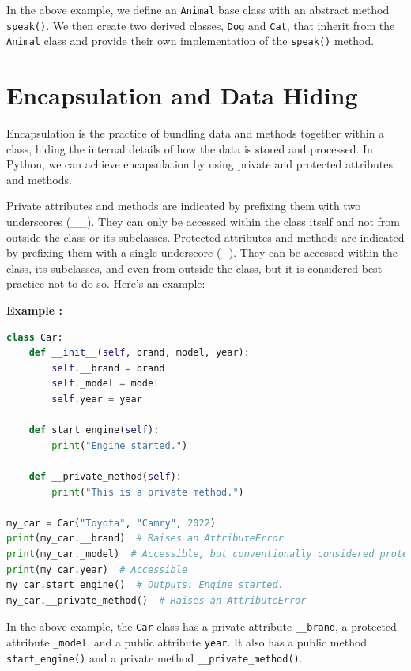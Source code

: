 \documentclass[12pt]{book}
\newtheorem{Example}{Example}[chapter]
\renewenvironment{Example}{\begin{trivlist}\item\relax
\textbf{Example \thesection: }}{\end{trivlist}}
\begin{document}
In the above example, we define an \texttt{Animal} base class with an abstract method \texttt{speak()}. We then create two derived classes, \texttt{Dog} and \texttt{Cat}, that inherit from the \texttt{Animal} class and provide their own implementation of the \texttt{speak()} method.

\section{Encapsulation and Data Hiding}

Encapsulation is the practice of bundling data and methods together within a class, hiding the internal details of how the data is stored and processed. In Python, we can achieve encapsulation by using private and protected attributes and methods.

Private attributes and methods are indicated by prefixing them with two underscores (\_\_). They can only be accessed within the class itself and not from outside the class or its subclasses. Protected attributes and methods are indicated by prefixing them with a single underscore (\_). They can be accessed within the class, its subclasses, and even from outside the class, but it is considered best practice not to do so. Here's an example:

\begin{Example}
\begin{lstlisting}[language=Python]
class Car:
    def __init__(self, brand, model, year):
        self.__brand = brand
        self._model = model
        self.year = year

    def start_engine(self):
        print("Engine started.")

    def __private_method(self):
        print("This is a private method.")

my_car = Car("Toyota", "Camry", 2022)
print(my_car.__brand)  # Raises an AttributeError
print(my_car._model)  # Accessible, but conventionally considered protected
print(my_car.year)  # Accessible
my_car.start_engine()  # Outputs: Engine started.
my_car.__private_method()  # Raises an AttributeError
\end{lstlisting}
\end{Example}

In the above example, the \texttt{Car} class has a private attribute \texttt{\_\_brand}, a protected attribute \texttt{\_model}, and a public attribute \texttt{year}. It also has a public method \texttt{start\_engine()} and a private method \texttt{\_\_private\_method()}.
\end{document}
